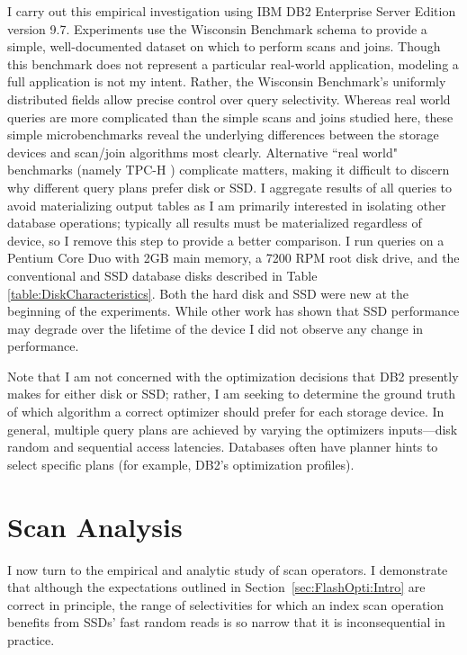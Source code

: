 I carry out this empirical investigation using IBM DB2 Enterprise Server Edition version 9.7.
Experiments use the Wisconsin Benchmark schema \cite{Bitton83benchmarkingdatabase} to provide a simple, well-documented dataset on which to perform scans and joins.
Though this benchmark does not represent a particular real-world application, modeling a full application is not my intent.
Rather, the Wisconsin Benchmark's uniformly distributed fields allow precise control over query selectivity.
Whereas real world queries are more complicated than the simple scans and joins studied here, these simple microbenchmarks reveal the underlying differences between the storage devices and scan/join algorithms most clearly.
Alternative ``real world" benchmarks (namely TPC-H \cite{TPCH}) complicate matters, making it difficult to discern why different query plans prefer disk or SSD.
I aggregate results of all queries to avoid materializing output tables as I am primarily interested in isolating other database operations; typically all results must be materialized regardless of device, so I remove this step to provide a better comparison.
I run queries on a Pentium Core Duo with 2GB main memory, a 7200 RPM root disk drive, and the conventional and SSD database disks described in Table \ref{table:DiskCharacteristics}.
Both the hard disk and SSD were new at the beginning of the experiments.
While other work has shown that SSD performance may degrade over the lifetime of the device I did not observe any change in performance.

Note that I am not concerned with the optimization decisions that DB2 presently makes for either disk or SSD; rather, I am seeking to determine the ground truth of which algorithm a correct optimizer should prefer for each storage device. 
In general, multiple query plans are achieved by varying the optimizers inputs---disk random and sequential access latencies.
Databases often have planner hints to select specific plans (for example, DB2's optimization profiles).

\section{Scan Analysis}
\label{sec:FlashOpti:Scans}

I now turn to the empirical and analytic study of scan operators.
I demonstrate that although the expectations outlined in Section~\ref{sec:FlashOpti:Intro} are correct in principle, the range of selectivities for which an index scan operation benefits from SSDs' fast random reads is so narrow that it is inconsequential in practice.

